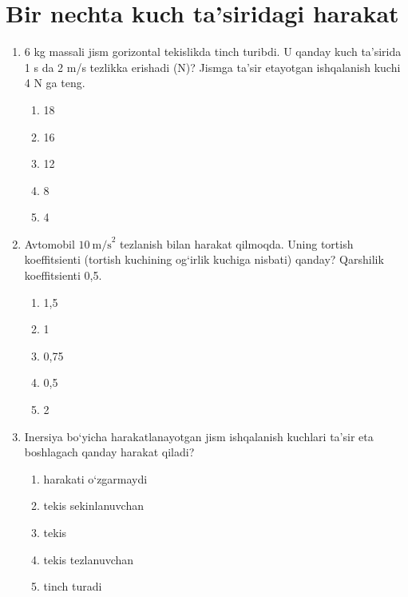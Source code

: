 \section{Bir nechta kuch ta’siridagi harakat}

\begin{enumerate}

\item 6 kg massali jism gorizontal tekislikda tinch turibdi.
U qanday kuch ta’sirida 1 s da 2 m/s tezlikka erishadi (N)?
Jismga ta’sir etayotgan ishqalanish kuchi 4 N ga teng.

\begin{enumerate}[label=\Alph*)]
\item 18
\item 16
\item 12
\item 8
\item 4
\end{enumerate}


\item Avtomobil $10\ \text{m/s}^2$ tezlanish bilan harakat qilmoqda.
Uning tortish koeffitsienti (tortish kuchining og‘irlik kuchiga nisbati) qanday?
Qarshilik koeffitsienti 0,5.

\begin{enumerate}[label=\Alph*)]
\item 1,5
\item 1
\item 0,75
\item 0,5
\item 2
\end{enumerate}


\item Inersiya bo‘yicha harakatlanayotgan jism ishqalanish kuchlari ta’sir eta boshlagach qanday harakat qiladi?


\begin{enumerate}[label=\Alph*)]
\item harakati o‘zgarmaydi
\item tekis sekinlanuvchan
\item tekis
\item tekis tezlanuvchan
\item tinch turadi
\end{enumerate}



\end{enumerate}
